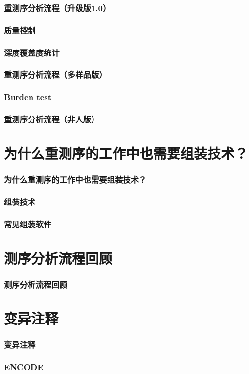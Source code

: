 \documentclass[12pt]{beamer}
\begin{document}
\begin{frame}\frametitle{重测序分析流程（升级版1.0）}
\end{frame}

\begin{frame}\frametitle{质量控制}
\end{frame}

\begin{frame}\frametitle{深度覆盖度统计}
\end{frame}

\begin{frame}\frametitle{重测序分析流程（多样品版）}
\end{frame}

\begin{frame}\frametitle{Burden test}
\end{frame}

\begin{frame}\frametitle{重测序分析流程（非人版）}
\end{frame}

\section{为什么重测序的工作中也需要组装技术？}
\begin{frame}\frametitle{为什么重测序的工作中也需要组装技术？}
  \begin{tikzpicture}
    
  \end{tikzpicture}
\end{frame}
\begin{frame}\frametitle{组装技术}
\end{frame}

\begin{frame}\frametitle{常见组装软件}
\end{frame}

\section{测序分析流程回顾}

\begin{frame}\frametitle{测序分析流程回顾}
\end{frame}

\section{变异注释}
\begin{frame}\frametitle{变异注释}
\end{frame}
\begin{frame}\frametitle{ENCODE}
\end{frame}
\end{document}
